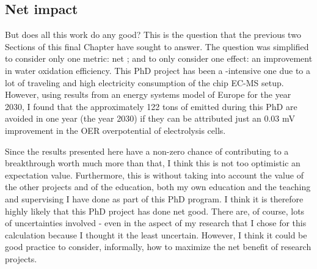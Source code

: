 \subsection*{Net  impact}

But does all this work do any good? This is the question that the previous two Sections of this final Chapter have sought to answer. The question was simplified to consider only one metric: net ; and to only consider one effect: an improvement in water oxidation efficiency. This PhD project has been a -intensive one due to a lot of traveling and high electricity consumption of the chip EC-MS setup. However, using results from an energy systems model of Europe for the year 2030, I found that the approximately 122 tons of  emitted during this PhD are avoided in one year (the year 2030) if they can be attributed just an 0.03 mV improvement in the OER overpotential of electrolysis cells.

Since the results presented here have a non-zero chance of contributing to a breakthrough worth much more than that, I think this is not too optimistic an expectation value. Furthermore, this is without taking into account the value of the other projects and of the education, both my own education and the teaching and supervising I have done as part of this PhD program. I think it is therefore highly likely that this PhD project has done net good. There are, of course, lots of uncertainties involved - even in the aspect of my research that I chose for this calculation because I thought it the least uncertain. However, I think it could be good practice to consider, informally, how to maximize the net  benefit of research projects.



